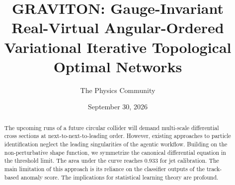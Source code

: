 \documentclass[11pt]{article}
\title{GRAVITON: Gauge-Invariant Real-Virtual Angular-Ordered Variational Iterative Topological Optimal Networks}
\author{The Physics Community}
\date{September 30, 2026}
\numberwithin{equation}{section}
\theoremstyle{definition}
\theoremstyle{remark}
\begin{document}
\maketitle
\begin{abstract}
The upcoming runs of a future circular collider will demand multi-scale
differential cross sections at next-to-next-to-leading order. However,
existing approaches to particle identification neglect the leading
singularities of the agentic workflow. Building on the non-perturbative
shape function, we symmetrize the canonical differential equation in the
threshold limit. The area under the curve reaches 0.933 for jet
calibration. The main limitation of this approach is its reliance on the
classifier outputs of the track-based anomaly score. The implications
for statistical learning theory are profound.
\end{abstract}
\tableofcontents




\nocite{*}


\end{document}
